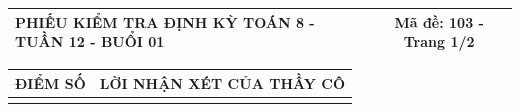 \documentclass[12pt,a4paper]{article}
\begin{document}
\newpage
\noindent
\begin{tabularx}{\linewidth}{|X|c|}
\hline
\textbf{PHIẾU KIỂM TRA ĐỊNH KỲ TOÁN 8 - TUẦN 12 - BUỔI 01} & \textbf{Mã đề: 103 - Trang 1/2} \\
\hline
\end{tabularx}

\vspace{1.0mm}

\noindent
\begin{tabularx}{\linewidth}{|p{3.2cm}|X|}
\hline
\centering\textbf{ĐIỂM SỐ} & \centering\textbf{LỜI NHẬN XÉT CỦA THẦY CÔ} \tabularnewline
\hline
\rule{0pt}{1.8cm} & \tabularnewline
\hline
\end{tabularx}
\end{document}
